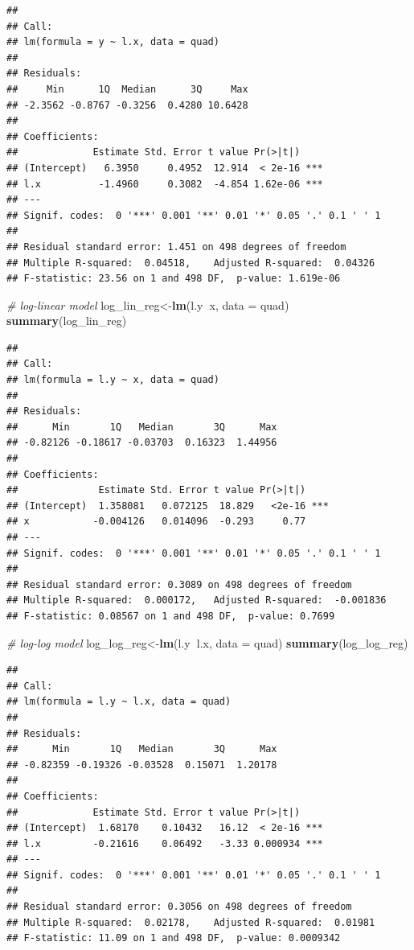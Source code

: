 \documentclass[]{book}
\newenvironment{Shaded}{\begin{snugshade}}{\end{snugshade}}
\newcommand{\KeywordTok}[1]{\textcolor[rgb]{0.13,0.29,0.53}{\textbf{#1}}}
\newcommand{\DataTypeTok}[1]{\textcolor[rgb]{0.13,0.29,0.53}{#1}}
\newcommand{\CommentTok}[1]{\textcolor[rgb]{0.56,0.35,0.01}{\textit{#1}}}
\newcommand{\OperatorTok}[1]{\textcolor[rgb]{0.81,0.36,0.00}{\textbf{#1}}}
\newcommand{\NormalTok}[1]{#1}
\theoremstyle{definition}
\theoremstyle{definition}
\theoremstyle{definition}
\theoremstyle{remark}
\begin{document}
\begin{verbatim}
## 
## Call:
## lm(formula = y ~ l.x, data = quad)
## 
## Residuals:
##     Min      1Q  Median      3Q     Max 
## -2.3562 -0.8767 -0.3256  0.4280 10.6428 
## 
## Coefficients:
##             Estimate Std. Error t value Pr(>|t|)    
## (Intercept)   6.3950     0.4952  12.914  < 2e-16 ***
## l.x          -1.4960     0.3082  -4.854 1.62e-06 ***
## ---
## Signif. codes:  0 '***' 0.001 '**' 0.01 '*' 0.05 '.' 0.1 ' ' 1
## 
## Residual standard error: 1.451 on 498 degrees of freedom
## Multiple R-squared:  0.04518,    Adjusted R-squared:  0.04326 
## F-statistic: 23.56 on 1 and 498 DF,  p-value: 1.619e-06
\end{verbatim}

\begin{Shaded}
\begin{Highlighting}[]
\CommentTok{# log-linear model}
\NormalTok{log_lin_reg<-}\KeywordTok{lm}\NormalTok{(l.y}\OperatorTok{~}\NormalTok{x, }\DataTypeTok{data =}\NormalTok{ quad)}
\KeywordTok{summary}\NormalTok{(log_lin_reg)}
\end{Highlighting}
\end{Shaded}

\begin{verbatim}
## 
## Call:
## lm(formula = l.y ~ x, data = quad)
## 
## Residuals:
##      Min       1Q   Median       3Q      Max 
## -0.82126 -0.18617 -0.03703  0.16323  1.44956 
## 
## Coefficients:
##              Estimate Std. Error t value Pr(>|t|)    
## (Intercept)  1.358081   0.072125  18.829   <2e-16 ***
## x           -0.004126   0.014096  -0.293     0.77    
## ---
## Signif. codes:  0 '***' 0.001 '**' 0.01 '*' 0.05 '.' 0.1 ' ' 1
## 
## Residual standard error: 0.3089 on 498 degrees of freedom
## Multiple R-squared:  0.000172,   Adjusted R-squared:  -0.001836 
## F-statistic: 0.08567 on 1 and 498 DF,  p-value: 0.7699
\end{verbatim}

\begin{Shaded}
\begin{Highlighting}[]
\CommentTok{# log-log model}
\NormalTok{log_log_reg<-}\KeywordTok{lm}\NormalTok{(l.y}\OperatorTok{~}\NormalTok{l.x, }\DataTypeTok{data =}\NormalTok{ quad)}
\KeywordTok{summary}\NormalTok{(log_log_reg)}
\end{Highlighting}
\end{Shaded}

\begin{verbatim}
## 
## Call:
## lm(formula = l.y ~ l.x, data = quad)
## 
## Residuals:
##      Min       1Q   Median       3Q      Max 
## -0.82359 -0.19326 -0.03528  0.15071  1.20178 
## 
## Coefficients:
##             Estimate Std. Error t value Pr(>|t|)    
## (Intercept)  1.68170    0.10432   16.12  < 2e-16 ***
## l.x         -0.21616    0.06492   -3.33 0.000934 ***
## ---
## Signif. codes:  0 '***' 0.001 '**' 0.01 '*' 0.05 '.' 0.1 ' ' 1
## 
## Residual standard error: 0.3056 on 498 degrees of freedom
## Multiple R-squared:  0.02178,    Adjusted R-squared:  0.01981 
## F-statistic: 11.09 on 1 and 498 DF,  p-value: 0.0009342
\end{verbatim}
\end{document}
